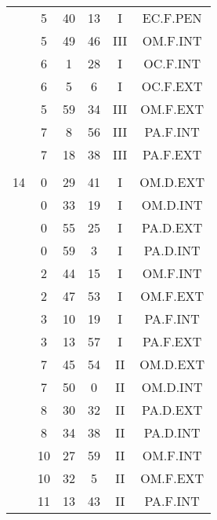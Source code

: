 \documentclass[12pt, a4paper]{article}
\begin{document}
\begin{multicols}{3}
{\begin{tabular}{c c c c c c}
	 	 	 	 & 5 & 40 & 13 & I & EC.F.PEN\\%
	 	 	 	 & 5 & 49 & 46 & III & OM.F.INT\\%
	 	 	 	 & 6 & 1 & 28 & I & OC.F.INT\\%
	 	 	 	 & 6 & 5 & 6 & I & OC.F.EXT\\%
	 	 	 	 & 5 & 59 & 34 & III & OM.F.EXT\\%
	 	 	 	 & 7 & 8 & 56 & III & PA.F.INT\\%
	 	 	 	 & 7 & 18 & 38 & III & PA.F.EXT\\%
	 	 	 	 & & & & & \\%
	 	 	 	14 & 0 & 29 & 41 & I & OM.D.EXT\\%
	 	 	 	 & 0 & 33 & 19 & I & OM.D.INT\\%
	 	 	 	 & 0 & 55 & 25 & I & PA.D.EXT\\%
	 	 	 	 & 0 & 59 & 3 & I & PA.D.INT\\%
	 	 	 	 & 2 & 44 & 15 & I & OM.F.INT\\%
	 	 	 	 & 2 & 47 & 53 & I & OM.F.EXT\\%
	 	 	 	 & 3 & 10 & 19 & I & PA.F.INT\\%
	 	 	 	 & 3 & 13 & 57 & I & PA.F.EXT\\%
	 	 	 	 & 7 & 45 & 54 & II & OM.D.EXT\\%
	 	 	 	 & 7 & 50 & 0 & II & OM.D.INT\\%
	 	 	 	 & 8 & 30 & 32 & II & PA.D.EXT\\%
	 	 	 	 & 8 & 34 & 38 & II & PA.D.INT\\%
	 	 	 	 & 10 & 27 & 59 & II & OM.F.INT\\%
	 	 	 	 & 10 & 32 & 5 & II & OM.F.EXT\\%
	 	 	 	 & 11 & 13 & 43 & II & PA.F.INT\\%

\end{tabular}}
\end{multicols}
\end{document}
